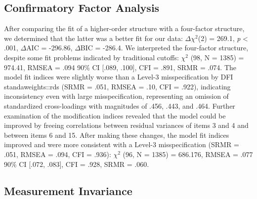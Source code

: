 \documentclass[
  12pt,
  twoside,
  openright,
  a4paper,
  chapter=TITLE,
  section=TITLE,
  brazil]{abntex2}
\begin{document}
\hypertarget{confirmatory-factor-analysis}{%
\subsection{Confirmatory Factor
Analysis}\label{confirmatory-factor-analysis}}

After comparing the fit of a higher-order structure with a four-factor
structure, we determined that the latter was a better fit for our data:
\(\Delta\chi^2\)(2) = 269.1, \emph{p} \textless{} .001, \(\Delta\)AIC =
-296.86, \(\Delta\)BIC = -286.4. We interpreted the four-factor
structure, despite some fit problems indicated by traditional cutoffs:
\(\chi^2\) (98, N = 1385) = 974.41, RMSEA = .094 90\% CI {[}.089,
.100{]}, CFI = .891, SRMR = .074. The model fit indices were slightly
worse than a Level-3 misspecification by DFI standaweights::rds (SRMR =
.051, RMSEA = .10, CFI = .922), indicating inconsistency even with large
misspecification, representing an omission of standardized
cross-loadings with magnitudes of .456, .443, and .464. Further
examination of the modification indices revealed that the model could be
improved by freeing correlations between residual variances of items 3
and 4 and between items 6 and 15. After making these changes, the model
fit indices improved and were more consistent with a Level-3
misspecification (SRMR = .051, RMSEA = .094, CFI = .936): \(\chi^2\)
(96, N = 1385) = 686.176, RMSEA = .077 90\% CI {[}.072, .083{]}, CFI =
.928, SRMR = .060.

\hypertarget{measurement-invariance-1}{%
\subsection{Measurement Invariance}\label{measurement-invariance-1}}
\end{document}
